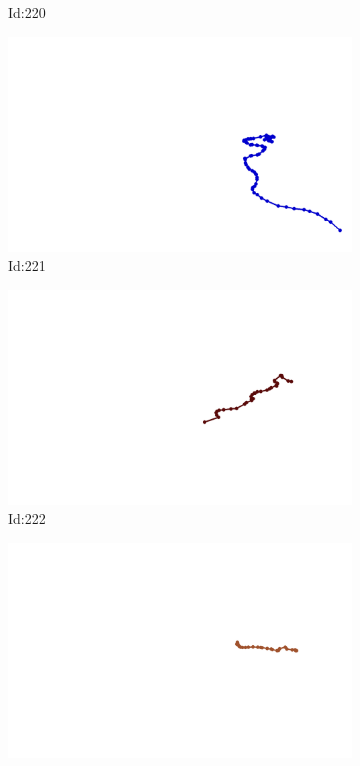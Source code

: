 \documentclass[12pt,twoside]{report}
\begin{document}
\begin{figure}
\begin{subfigure}[b]{0.20\textwidth}
\caption{Id:220}
\end{subfigure}
\begin{subfigure}[b]{0.20\textwidth}
\centering
\includegraphics[width=\textwidth]{../trajectories/221.png}
\caption{Id:221}
\end{subfigure}
\begin{subfigure}[b]{0.20\textwidth}
\centering
\includegraphics[width=\textwidth]{../trajectories/222.png}
\caption{Id:222}
\end{subfigure}
\begin{subfigure}[b]{0.20\textwidth}
\centering
\includegraphics[width=\textwidth]{../trajectories/247.png}

\end{subfigure}
\end{figure}
\end{document}
